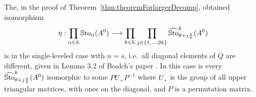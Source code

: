 \begin{rem}
  The, in the proof of Theorem~\ref{thm:theoremForlargerDecomp}, obtained
  isomorphism
  \[
    \eta: \prod_{\alpha\in\mathbb{A}}\operatorname{\mathbb{S}to}_{\alpha}(A^0) \longrightarrow
    \prod_{k\in\mathcal{K}} \prod_{j\in\{1,\dots,2k\}}
    \widehat{\operatorname{\mathbb{S}to}}_{\theta+j\frac{\pi}{k}}^k(A^0)
  \]
  is in the single-leveled case with $n=s$, i.e.\ all diagonal elements of
  $Q$ are different, given in Lemma 3.2 of Boalch's paper
  \cite[Lem.3.2]{boalch}.
  In this case is every $\widehat{\operatorname{\mathbb{S}to}}_{\theta+j\frac{\pi}{k}}^k(A^0)$ isomorphic
  to some $PU_+P^{-1}$ where $U_+$ is the group of all upper triangular
  matrices, with ones on the diagonal, and $P$ is a permutation matrix.
\end{rem}
